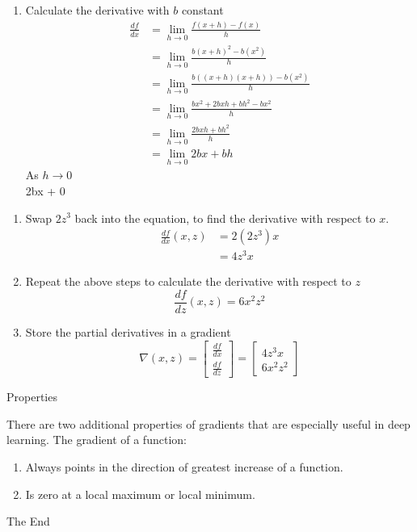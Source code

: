 \documentclass{beamer}
\begin{document}
\begin{frame}
    \begin{enumerate}
		\item Calculate the derivative with $b$ constant
		\begin{align*}
			\frac{df}{dx} &= \lim_{h \to 0}\frac{f(x + h) - f(x)}{h} \\
			&= \lim_{h \to 0}\frac{b(x + h)^2 - b(x^2)}{h} \\
			&= \lim_{h \to 0}\frac{b((x + h)(x + h)) - b(x^2)}{h} \\
			&= \lim_{h \to 0}\frac{bx^2 + 2bxh + bh^2 - bx^2}{h} \\
			&= \lim_{h \to 0}\frac{2bxh + bh^2}{h} \\
			&= \lim_{h \to 0}2bx + bh 	
		\end{align*}
	As $h \to 0$ \\
	2bx + 0
	\end{enumerate}
\end{frame}

\begin{frame}
	\begin{enumerate}
		\item Swap $2z^3$ back into the equation, to find the derivative with respect to $x$.
		\begin{align*}
			\frac{df}{dx}(x, z) &= 2(2z^3)x \\
			&= 4z^3x
		\end{align*}
		\item Repeat the above steps to calculate the derivative with respect to $z$
		\begin{equation*}
			\frac{df}{dz}(x, z) = 6x^2z^2
		\end{equation*}
		\item Store the partial derivatives in a gradient
		\begin{equation*}
			\nabla(x,z) = \begin{bmatrix}
							\frac{df}{dx} \\
							\frac{df}{dz}
						  \end{bmatrix} = \begin{bmatrix}
											4z^3x \\
											6x^2z^2
										  \end{bmatrix}
		\end{equation*}
    \end{enumerate}
\end{frame}

\begin{frame}{Properties}
	\begin{flushleft}
		There are two additional properties of gradients that are especially useful in deep learning. The gradient of a function:
	\end{flushleft}
		\begin{enumerate}
			\item Always points in the direction of greatest increase of a function.
			\item Is zero at a local maximum or local minimum.	
		\end{enumerate}
\end{frame}
\begin{frame}
\huge{\centerline{The End}}
\end{frame}
\end{document}
